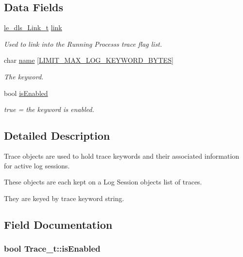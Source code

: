 \subsection*{Data Fields}
\begin{DoxyCompactItemize}
\item 
\hyperlink{structle__dls___link__t}{le\+\_\+dls\+\_\+\+Link\+\_\+t} \hyperlink{struct_trace__t_a54050df9e1810fca96562e2865330660}{link}
\begin{DoxyCompactList}\small\item\em Used to link into the Running Process\textquotesingle{}s trace flag list. \end{DoxyCompactList}\item 
char \hyperlink{struct_trace__t_a7900d4ebfa58a6df434932e40304eb8b}{name} \mbox{[}\hyperlink{limit_8h_a295c601381a60220239f4c26403a59cb}{L\+I\+M\+I\+T\+\_\+\+M\+A\+X\+\_\+\+L\+O\+G\+\_\+\+K\+E\+Y\+W\+O\+R\+D\+\_\+\+B\+Y\+T\+ES}\mbox{]}
\begin{DoxyCompactList}\small\item\em The keyword. \end{DoxyCompactList}\item 
bool \hyperlink{struct_trace__t_a0ca46c6b086814d31e7898f47a421b3b}{is\+Enabled}
\begin{DoxyCompactList}\small\item\em true = the keyword is enabled. \end{DoxyCompactList}\end{DoxyCompactItemize}


\subsection{Detailed Description}
Trace objects are used to hold trace keywords and their associated information for active log sessions.

These objects are each kept on a Log Session object\textquotesingle{}s list of traces.

They are keyed by trace keyword string. 

\subsection{Field Documentation}
\subsubsection[{\texorpdfstring{is\+Enabled}{isEnabled}}]{\setlength{\rightskip}{0pt plus 5cm}bool Trace\+\_\+t\+::is\+Enabled}\hypertarget{struct_trace__t_a0ca46c6b086814d31e7898f47a421b3b}{}\label{struct_trace__t_a0ca46c6b086814d31e7898f47a421b3b}


